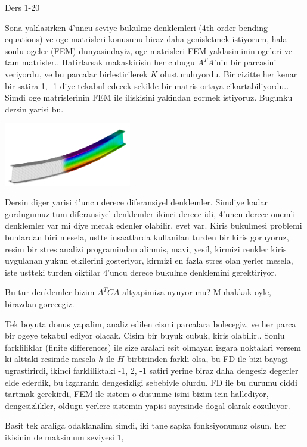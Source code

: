 \documentclass[12pt,fleqn]{article}\usepackage{../../common}
\begin{document}
Ders 1-20

Sona yaklasirken 4'uncu seviye bukulme denklemleri (4th order bending equations)
ve oge matrisleri konusunu biraz daha genisletmek istiyorum, hala sonlu ogeler
(FEM) dunyasindayiz, oge matrisleri FEM yaklasiminin ogeleri ve tam
matrisler.. Hatirlarsak makaskirisin her cubugu $A^T A$'nin bir parcasini
veriyordu, ve bu parcalar birlestirilerek $K$ olusturuluyordu. Bir cizitte her
kenar bir satira 1, -1 diye tekabul edecek sekilde bir matris ortaya
cikartabiliyordu.. Simdi oge matrislerinin FEM ile iliskisini yakindan gormek
istiyoruz. Bugunku dersin yarisi bu.

\includegraphics[width=15em]{compscieng_1_20_01.png}

Dersin diger yarisi 4'uncu derece diferansiyel denklemler. Simdiye kadar
gordugumuz tum diferansiyel denklemler ikinci derece idi, 4'uncu derece onemli
denklemler var mi diye merak edenler olabilir, evet var. Kiris bukulmesi
problemi bunlardan biri mesela, ustte insaatlarda kullanilan turden bir kiris
goruyoruz, resim bir stres analizi programindan alinmis, mavi, yesil, kirmizi
renkler kiris uygulanan yukun etkilerini gosteriyor, kirmizi en fazla stres olan
yerler mesela, iste ustteki turden ciktilar 4'uncu derece bukulme denklemini
gerektiriyor.

Bu tur denklemler bizim $A^T C A$ altyapimiza uyuyor mu? Muhakkak oyle,
birazdan gorecegiz. 

Tek boyuta donus yapalim, analiz edilen cismi parcalara bolecegiz, ve her parca
bir ogeye tekabul ediyor olacak. Cisim bir buyuk cubuk, kiris olabilir..  Sonlu
farkliliklar (finite differences) ile size aralari esit olmayan izgara noktalari
versem ki alttaki resimde mesela $h$ ile $H$ birbirinden farkli olsa, bu FD ile
bizi bayagi ugrastirirdi, ikinci farkliliktaki -1, 2, -1 satiri yerine biraz
daha dengesiz degerler elde ederdik, bu izgaranin dengesizligi sebebiyle
olurdu. FD ile bu durumu ciddi tartmak gerekirdi, FEM ile sistem o dusunme isini
bizim icin hallediyor, dengesizlikler, oldugu yerlere sistemin yapisi
sayesinde dogal olarak cozuluyor. 

Basit tek araliga odaklanalim simdi, iki tane sapka fonksiyonumuz olsun, her
ikisinin de maksimum seviyesi 1,
\end{document}
